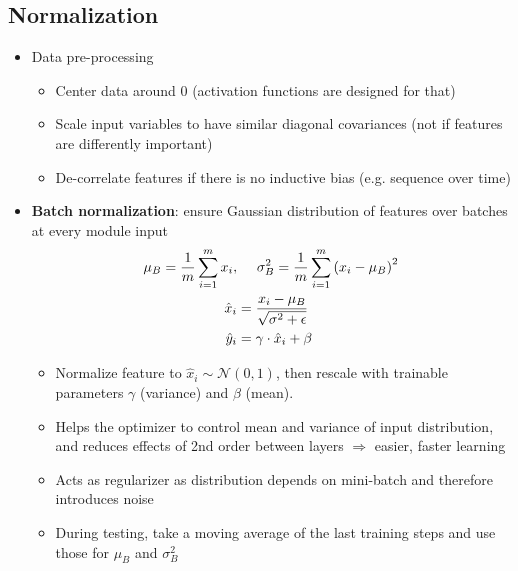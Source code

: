 \subsection{Normalization}
\begin{itemize}
	\item Data pre-processing
	\begin{itemize}
		\item Center data around 0 (activation functions are designed for that)
		\item Scale input variables to have similar diagonal covariances (not if features are differently important)
		\item De-correlate features if there is no inductive bias (e.g. sequence over time)
	\end{itemize}
	\item \textbf{Batch normalization}: ensure Gaussian distribution of features over batches at every module input
	\begin{equation*}
		\begin{split}
			\mu_B = \frac{1}{m} \sum\limits_{i=1}^{m} x_i, &\hspace{5mm} \sigma_B^2 = \frac{1}{m} \sum\limits_{i=1}^{m} \left(x_i - \mu_B\right)^2 \\
			\hat{x}_i & = \frac{x_i - \mu_B}{\sqrt{\sigma^2 + \epsilon}} \\
			\hat{y}_i & = \gamma \cdot \hat{x}_i + \beta
		\end{split}
	\end{equation*}
	\begin{itemize}
		\item Normalize feature to $\hat{x}_i \sim \mathcal{N}(0,1)$, then rescale with trainable parameters $\gamma$ (variance) and $\beta$ (mean).
		\item Helps the optimizer to control mean and variance of input distribution, and reduces effects of 2nd order between layers $\Rightarrow$ easier, faster learning 
		\item Acts as regularizer as distribution depends on mini-batch and therefore introduces noise
		\item During testing, take a moving average of the last training steps and use those for $\mu_B$ and $\sigma_B^2$
	\end{itemize}
\end{itemize}
